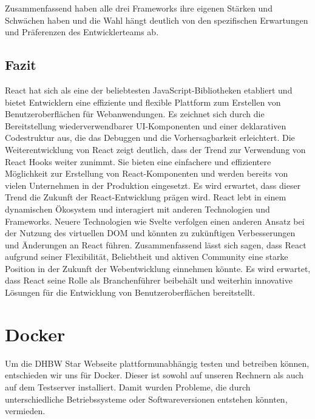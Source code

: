 Zusammenfassend haben alle drei Frameworks ihre eigenen Stärken und Schwächen haben und die Wahl hängt deutlich von den spezifischen Erwartungen und Präferenzen des Entwicklerteams ab.

\subsection{Fazit}
React hat sich als eine der beliebtesten JavaScript-Bibliotheken etabliert und bietet Entwicklern eine effiziente und flexible Plattform zum Erstellen von Benutzeroberflächen für Webanwendungen. Es zeichnet sich durch die Bereitstellung wiederverwendbarer UI-Komponenten und einer deklarativen Codestruktur aus, die das Debuggen und die Vorhersagbarkeit erleichtert. 
Die Weiterentwicklung von React zeigt deutlich, dass der Trend zur Verwendung von React Hooks weiter zunimmt. Sie bieten eine einfachere und effizientere Möglichkeit zur Erstellung von React-Komponenten  und werden bereits von vielen Unternehmen in der Produktion eingesetzt. Es wird erwartet, dass dieser Trend die Zukunft der React-Entwicklung  prägen wird.  React lebt in einem dynamischen Ökosystem und interagiert mit anderen Technologien und Frameworks. Neuere Technologien wie Svelte verfolgen einen anderen Ansatz bei der Nutzung des virtuellen DOM und könnten zu zukünftigen Verbesserungen und Änderungen an React führen. 
Zusammenfassend lässt sich sagen, dass React aufgrund seiner Flexibilität, Beliebtheit und aktiven Community  eine starke Position in der Zukunft der Webentwicklung einnehmen könnte. Es wird erwartet, dass React seine Rolle als Branchenführer beibehält und weiterhin innovative Lösungen für die Entwicklung von Benutzeroberflächen bereitstellt.

\section{Docker}

\begin{figure}
	\centering
\end{figure}

Um die DHBW Star Webseite plattformunabhängig testen und betreiben können, entschieden wir uns für Docker. Dieser ist sowohl auf unseren Rechnern als auch auf dem Testserver installiert. Damit wurden Probleme, die durch unterschiedliche Betriebssysteme oder Softwareversionen entstehen könnten, vermieden.

